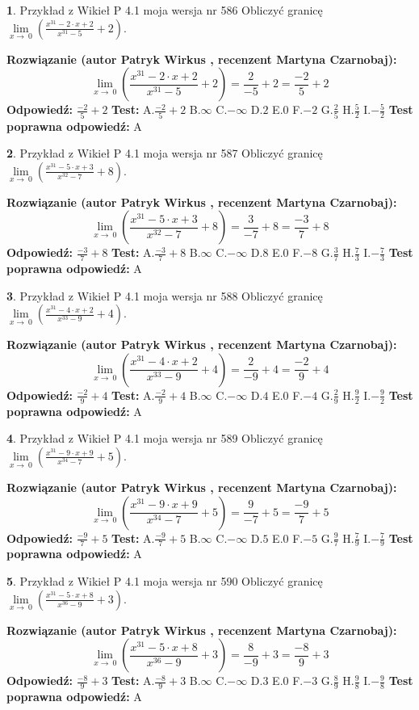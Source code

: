 \documentclass[12pt, a4paper]{article}
\theoremstyle{definition} %
\newtheorem{zad}{}
\newcommand{\zadStart}[1]{\begin{zad}#1\newline}
\newcommand{\zadStop}{\end{zad}}
\newcommand{\rozwStart}[2]{\noindent \textbf{Rozwiązanie (autor #1 , recenzent #2): }\newline}
\newcommand{\rozwStop}{\newline}
\newcommand{\odpStart}{\noindent \textbf{Odpowiedź:}\newline}
\newcommand{\odpStop}{\newline}
\newcommand{\testStart}{\noindent \textbf{Test:}\newline}
\newcommand{\testStop}{\newline}
\newcommand{\kluczStart}{\noindent \textbf{Test poprawna odpowiedź:}\newline}
\newcommand{\kluczStop}{\newline}
\begin{document}
\zadStart{Przykład z Wikieł P 4.1 moja wersja nr 586}
Obliczyć granicę $\lim\limits_{x\to\ 0}(\frac{x^{31}-2 \cdot x +2}{x^{31}-5}+2)$.
\zadStop
\rozwStart{Patryk Wirkus}{Martyna Czarnobaj}
$$\lim\limits_{x\to\ 0}(\frac{x^{31}-2 \cdot x +2}{x^{31}-5}+2)=\frac{2}{-5}+2=\frac{-2}{5}+2$$
\rozwStop
\odpStart
$\frac{-2}{5}+2$
\odpStop
\testStart
A.$\frac{-2}{5}+2$
B.$\infty$
C.$-\infty$
D.$2$
E.$0$
F.$-2$
G.$\frac{2}{5}$
H.$\frac{5}{2}$
I.$-\frac{5}{2}$
\testStop
\kluczStart
A
\kluczStop



\zadStart{Przykład z Wikieł P 4.1 moja wersja nr 587}
Obliczyć granicę $\lim\limits_{x\to\ 0}(\frac{x^{31}-5 \cdot x +3}{x^{32}-7}+8)$.
\zadStop
\rozwStart{Patryk Wirkus}{Martyna Czarnobaj}
$$\lim\limits_{x\to\ 0}(\frac{x^{31}-5 \cdot x +3}{x^{32}-7}+8)=\frac{3}{-7}+8=\frac{-3}{7}+8$$
\rozwStop
\odpStart
$\frac{-3}{7}+8$
\odpStop
\testStart
A.$\frac{-3}{7}+8$
B.$\infty$
C.$-\infty$
D.$8$
E.$0$
F.$-8$
G.$\frac{3}{7}$
H.$\frac{7}{3}$
I.$-\frac{7}{3}$
\testStop
\kluczStart
A
\kluczStop



\zadStart{Przykład z Wikieł P 4.1 moja wersja nr 588}
Obliczyć granicę $\lim\limits_{x\to\ 0}(\frac{x^{31}-4 \cdot x +2}{x^{33}-9}+4)$.
\zadStop
\rozwStart{Patryk Wirkus}{Martyna Czarnobaj}
$$\lim\limits_{x\to\ 0}(\frac{x^{31}-4 \cdot x +2}{x^{33}-9}+4)=\frac{2}{-9}+4=\frac{-2}{9}+4$$
\rozwStop
\odpStart
$\frac{-2}{9}+4$
\odpStop
\testStart
A.$\frac{-2}{9}+4$
B.$\infty$
C.$-\infty$
D.$4$
E.$0$
F.$-4$
G.$\frac{2}{9}$
H.$\frac{9}{2}$
I.$-\frac{9}{2}$
\testStop
\kluczStart
A
\kluczStop



\zadStart{Przykład z Wikieł P 4.1 moja wersja nr 589}
Obliczyć granicę $\lim\limits_{x\to\ 0}(\frac{x^{31}-9 \cdot x +9}{x^{34}-7}+5)$.
\zadStop
\rozwStart{Patryk Wirkus}{Martyna Czarnobaj}
$$\lim\limits_{x\to\ 0}(\frac{x^{31}-9 \cdot x +9}{x^{34}-7}+5)=\frac{9}{-7}+5=\frac{-9}{7}+5$$
\rozwStop
\odpStart
$\frac{-9}{7}+5$
\odpStop
\testStart
A.$\frac{-9}{7}+5$
B.$\infty$
C.$-\infty$
D.$5$
E.$0$
F.$-5$
G.$\frac{9}{7}$
H.$\frac{7}{9}$
I.$-\frac{7}{9}$
\testStop
\kluczStart
A
\kluczStop



\zadStart{Przykład z Wikieł P 4.1 moja wersja nr 590}
Obliczyć granicę $\lim\limits_{x\to\ 0}(\frac{x^{31}-5 \cdot x +8}{x^{36}-9}+3)$.
\zadStop
\rozwStart{Patryk Wirkus}{Martyna Czarnobaj}
$$\lim\limits_{x\to\ 0}(\frac{x^{31}-5 \cdot x +8}{x^{36}-9}+3)=\frac{8}{-9}+3=\frac{-8}{9}+3$$
\rozwStop
\odpStart
$\frac{-8}{9}+3$
\odpStop
\testStart
A.$\frac{-8}{9}+3$
B.$\infty$
C.$-\infty$
D.$3$
E.$0$
F.$-3$
G.$\frac{8}{9}$
H.$\frac{9}{8}$
I.$-\frac{9}{8}$
\testStop
\kluczStart
A
\kluczStop
\end{document}
